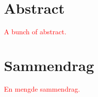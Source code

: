 \chapter*{Abstract}

\textcolor{red}{
  A bunch of abstract.
}

\chapter*{Sammendrag}

\textcolor{red}{
  En mengde sammendrag.
}

